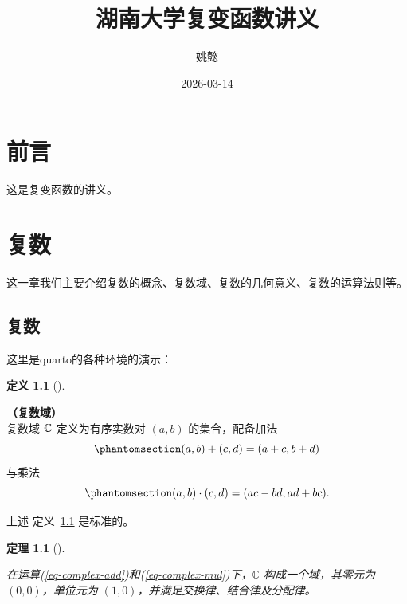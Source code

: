 \documentclass[
  chinese-hans,
  letterpaper,
  fontset=fandol]{ctexbook}
\title{湖南大学复变函数讲义}
\author{姚懿}
\date{2026-03-14}
\renewcommand*\contentsname{目录}
\newcommand\contentsname{目录}
\theoremstyle{definition}
\theoremstyle{plain}
\newtheorem{theorem}{定理}[chapter]
\theoremstyle{definition}
\newtheorem{definition}{定义}[chapter]
\theoremstyle{plain}
\theoremstyle{definition}
\theoremstyle{remark}
\begin{document}
\frontmatter
\maketitle

\renewcommand*\contentsname{目录}
{
\hypersetup{linkcolor=}
\setcounter{tocdepth}{2}
\tableofcontents
}

\mainmatter
{}

\chapter*{前言}\label{ux524dux8a00}


这是复变函数的讲义。


\chapter{复数}\label{ux590dux6570}

这一章我们主要介绍复数的概念、复数域、复数的几何意义、复数的运算法则等。

\section{复数}\label{ux590dux6570-1}

这里是quarto的各种环境的演示：

\begin{definition}[]\protect\hypertarget{def-complex-field}{}\label{def-complex-field}

\textbf{（复数域）}\\
复数域 \(\mathbb{C}\) 定义为有序实数对 \((a,b)\) 的集合，配备加法\\
\begin{equation}\phantomsection\label{eq-complex-add}{(a,b)+(c,d)=(a+c,b+d)}\end{equation}
与乘法\\
\begin{equation}\phantomsection\label{eq-complex-mul}{(a,b)\cdot(c,d)=(ac-bd,ad+bc).}\end{equation}

\end{definition}

上述 定义~\ref{def-complex-field} 是标准的。

\begin{theorem}[]\protect\hypertarget{thm-complex-field}{}\label{thm-complex-field}

在运算(\ref{eq-complex-add})和(\ref{eq-complex-mul})下，\(\mathbb{C}\)
构成一个域，其零元为 \((0,0)\)，单位元为
\((1,0)\)，并满足交换律、结合律及分配律。

\end{theorem}
\end{document}
